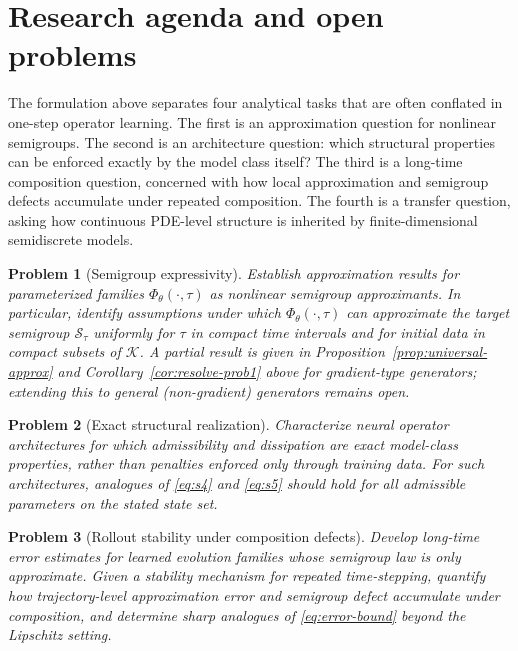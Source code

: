 \documentclass[11pt]{article}
\newtheorem{problem}{Problem}
\newcommand{\cS}{\mathcal{S}}
\newcommand{\cK}{\mathcal{K}}
\newcommand{\PhiT}{\Phi_{\theta}}
\begin{document}
\section{Research agenda and open problems}\label{sec:analytical-questions}
The formulation above separates four analytical tasks that are often conflated in one-step operator learning. The first is an approximation question for nonlinear semigroups. The second is an architecture question: which structural properties can be enforced exactly by the model class itself? The third is a long-time composition question, concerned with how local approximation and semigroup defects accumulate under repeated composition. The fourth is a transfer question, asking how continuous PDE-level structure is inherited by finite-dimensional semidiscrete models.

\begin{problem}[Semigroup expressivity]\label{prob:expressivity}
Establish approximation results for parameterized families \(\PhiT(\cdot,\tau)\) as nonlinear semigroup approximants. In particular, identify assumptions under which \(\PhiT(\cdot,\tau)\) can approximate the target semigroup \(\cS_{\tau}\) uniformly for \(\tau\) in compact time intervals and for initial data in compact subsets of \(\cK\). A partial result is given in Proposition~\ref{prop:universal-approx} and Corollary~\ref{cor:resolve-prob1} above for gradient-type generators; extending this to general (non-gradient) generators remains open.
\end{problem}

\begin{problem}[Exact structural realization]
Characterize neural operator architectures for which admissibility and dissipation are exact model-class properties, rather than penalties enforced only through training data. For such architectures, analogues of \eqref{eq:s4} and \eqref{eq:s5} should hold for all admissible parameters on the stated state set.
\end{problem}

\begin{problem}[Rollout stability under composition defects]
Develop long-time error estimates for learned evolution families whose semigroup law is only approximate. Given a stability mechanism for repeated time-stepping, quantify how trajectory-level approximation error and semigroup defect accumulate under composition, and determine sharp analogues of \eqref{eq:error-bound} beyond the Lipschitz setting.
\end{problem}
\end{document}
